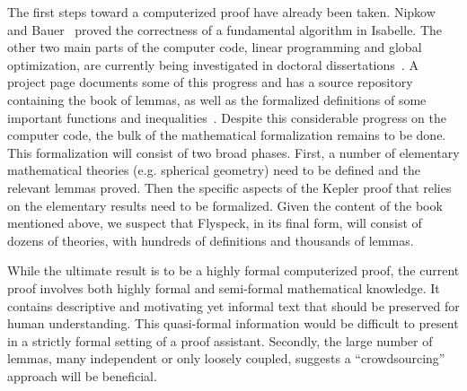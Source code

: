 \begin{background}
The first steps toward a computerized proof have already been taken.  Nipkow and
Bauer~\cite{Nipkow:2005:Tame} proved the correctness of a fundamental algorithm
in Isabelle.  The other two main parts of the computer code, linear programming
and global optimization, are currently being investigated in doctoral
dissertations~\cite{Zumkeller:2006:TaylorModels,Obua:2005:LinearPrograms}.  A
project page documents some of this progress and has a source repository
containing the book of lemmas, as well as the formalized definitions of some
important functions and inequalities~\cite{website:FlyspeckProjectPage}.
Despite this considerable progress on the computer code, the bulk of the
mathematical formalization remains to be done.  This formalization will consist
of two broad phases.  First, a number of elementary mathematical theories
(e.g. spherical geometry) need to be defined and the relevant lemmas proved.
Then the specific aspects of the Kepler proof that relies on the elementary
results need to be formalized.  Given the content of the book mentioned above,
we suspect that Flyspeck, in its final form, will consist of dozens of theories,
with hundreds of definitions and thousands of lemmas.
\end{background}

\begin{motivation}
  While the ultimate result is to be a highly formal computerized proof,
the current proof involves both highly formal and semi-formal mathematical
knowledge.  It contains descriptive and motivating yet informal text that should
be preserved for human understanding.  This quasi-formal information would be
difficult to present in a strictly formal setting of a proof assistant.
Secondly, the large number of lemmas, many independent or only loosely coupled,
suggests a ``crowdsourcing'' approach will be beneficial. 
\end{motivation}

